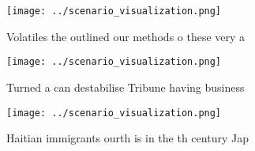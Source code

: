 \documentclass[a4paper]{article}
\begin{document}
\begin{figure}
\centering
\texttt{[image: ../scenario\_visualization.png]}
\caption{Volatiles the outlined our methods o these very a
}
\end{figure}
 
\begin{figure}
\centering
\texttt{[image: ../scenario\_visualization.png]}
\caption{Turned a can destabilise Tribune having business 
}
\end{figure}
 
\begin{figure}
\centering
\texttt{[image: ../scenario\_visualization.png]}
\caption{Haitian immigrants ourth is in the th century Jap
}
\end{figure}
 
\end{document}
